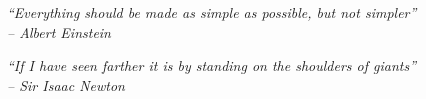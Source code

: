 %
%
%



\vspace*{7cm}

\begin{flushright}

\emph{``Everything should be made as simple as possible, but not simpler''} \\
\emph{-- Albert Einstein}

\vspace*{2cm}

\emph{``If I have seen farther it is by standing on the shoulders of giants''} \\
\emph{-- Sir Isaac Newton}

\end{flushright}
